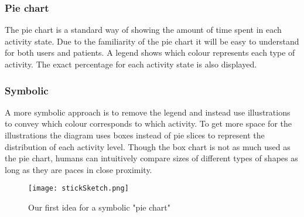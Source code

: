 \subsubsection{Pie chart}
The pie chart is a standard way of showing the amount of time spent in each activity state. Due to the familiarity of the pie chart it will be easy to understand for both users and patients. A legend shows which colour represents each type of activity. The exact percentage for each activity state is also displayed.

\subsubsection{Symbolic}
A more symbolic approach is to remove the legend and instead use illustrations to convey which colour corresponds to which activity. To get more space for the illustrations the diagram uses boxes instead of pie slices to represent the distribution of each activity level. Though the box chart is not as much used as the pie chart, humans can intuitively compare sizes of different types of shapes as long as they are paces in close proximity. 


\begin{figure}[h!]
	\centering
		\texttt{[image: stickSketch.png]}
		\caption{\footnotesize Our first idea for a symbolic "pie chart"}
		\label{fig:symbolicPie}
\end{figure}

